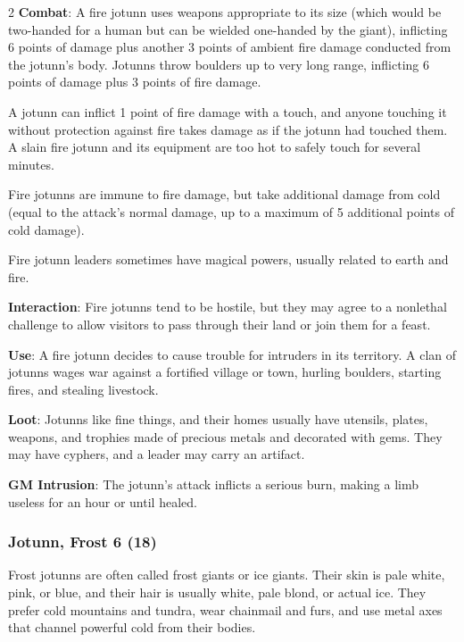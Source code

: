 \begin{multicols}{2}
\textbf{Combat}: A fire jotunn uses weapons appropriate to its size (which would be two-handed for a human but can be wielded one-handed by the giant), inflicting 6 points of damage plus another 3 points of ambient fire damage conducted from the jotunn’s body. Jotunns throw boulders up to very long range, inflicting 6 points of damage plus 3 points of fire damage. 

A jotunn can inflict 1 point of fire damage with a touch, and anyone touching it without protection against fire takes damage as if the jotunn had touched them. A slain fire jotunn and its equipment are too hot to safely touch for several minutes. 

Fire jotunns are immune to fire damage, but take additional damage from cold (equal to the attack’s normal damage, up to a maximum of 5 additional points of cold damage). 

Fire jotunn leaders sometimes have magical powers, usually related to earth and fire. 

\textbf{Interaction}: Fire jotunns tend to be hostile, but they may agree to a nonlethal challenge to allow visitors to pass through their land or join them for a feast. 

\textbf{Use}: A fire jotunn decides to cause trouble for intruders in its territory. A clan of jotunns wages war against a fortified village or town, hurling boulders, starting fires, and stealing livestock. 

\textbf{Loot}: Jotunns like fine things, and their homes usually have utensils, plates, weapons, and trophies made of precious metals and decorated with gems. They may have cyphers, and a leader may carry an artifact.

\textbf{GM Intrusion}: The jotunn’s attack inflicts a serious burn, making a limb useless for an hour or until healed.

\subsubsection{Jotunn, Frost 6 (18)}

Frost jotunns are often called frost giants or ice giants. Their skin is pale white, pink, or blue, and their hair is usually white, pale blond, or actual ice. They prefer cold mountains and tundra, wear chainmail and furs, and use metal axes that channel powerful cold from their bodies. 


\end{multicols}
